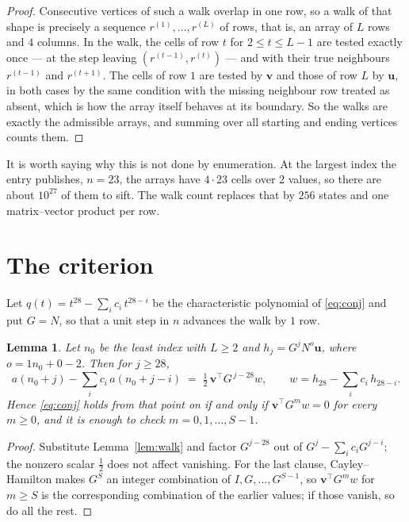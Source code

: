 \documentclass[11pt,a4paper]{article}
\theoremstyle{plain}
\newtheorem{lemma}[theorem]{Lemma}
\theoremstyle{definition}
\begin{document}
\begin{proof}
Consecutive vertices of such a walk overlap in one row, so a walk of that shape is
precisely a sequence $r^{(1)},\dots,r^{(L)}$ of rows, that is, an array of $L$ rows
and $4$ columns. In the walk, the cells of row $t$ for $2\le t\le L-1$ are tested
exactly once --- at the step leaving $(r^{(t-1)},r^{(t)})$ --- and with their true
neighbours $r^{(t-1)}$ and $r^{(t+1)}$. The cells of row $1$ are tested by
$\mathbf{v}$ and those of row $L$ by $\mathbf{u}$, in both cases by the same condition
with the missing neighbour row treated as absent, which is how the array itself behaves at
its boundary. So the walks are exactly the admissible arrays, and summing over all starting
and ending vertices counts them.
\end{proof}


It is worth saying why this is not done by enumeration. At the largest index the entry
publishes, $n=23$, the arrays have $4\cdot23$ cells over
$2$ values, so there are about $10^{27}$ of them to sift. The
walk count replaces that by $256$ states and one matrix--vector product per row.
\section{The criterion}

Let $q(t)=t^{28}-\sum_i c_i\,t^{28-i}$ be the characteristic polynomial of
\eqref{eq:conj} and put $G=N$, so that a unit step in $n$ advances the walk by
$1$ row.

\begin{lemma}\label{lem:crit}
Let $n_0$ be the least index with $L\ge2$ and $h_j=G^{j}N^{o}\mathbf{u}$, where
$o=1n_0+0-2$. Then for $j\ge28$,
\[
a(n_0+j)-\sum_i c_i\,a(n_0+j-i)\;=\;\tfrac1{2}\,\mathbf{v}^{\!\top}G^{\,j-28}w,
\qquad w=h_{28}-\sum_i c_i\,h_{28-i} .
\]
Hence \eqref{eq:conj} holds from that point on if and only if
$\mathbf{v}^{\!\top}G^{m}w=0$ for every $m\ge0$, and it is enough to check
$m=0,1,\dots,S-1$.
\end{lemma}

\begin{proof}
Substitute Lemma~\ref{lem:walk} and factor $G^{j-28}$ out of
$G^{j}-\sum_ic_iG^{j-i}$; the nonzero scalar $\tfrac1{2}$ does not affect
vanishing. For the last clause, Cayley--Hamilton makes $G^{S}$ an integer combination of
$I,G,\dots,G^{S-1}$, so $\mathbf{v}^{\!\top}G^{m}w$ for $m\ge S$ is the corresponding
combination of the earlier values; if those vanish, so do all the rest.
\end{proof}
\end{document}
